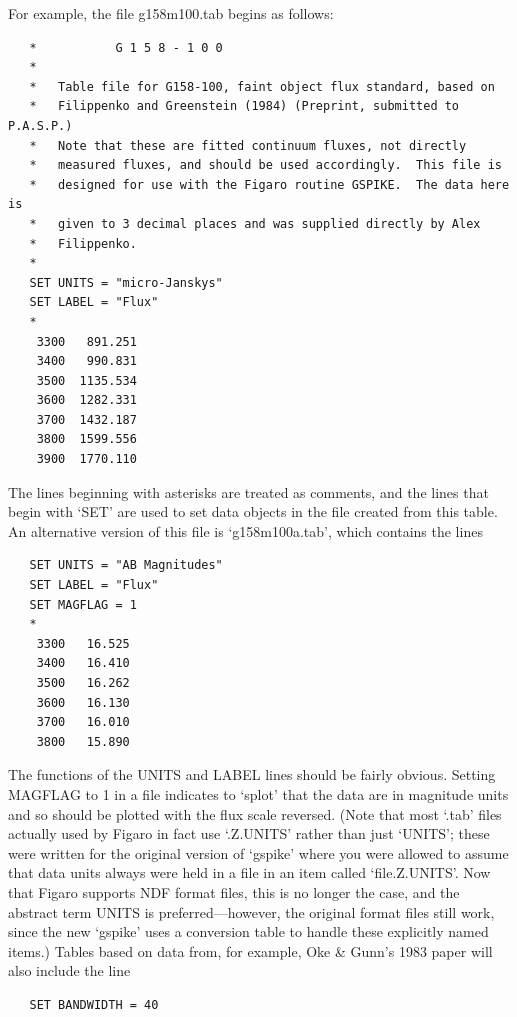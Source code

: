 \documentclass[11pt,twoside]{article}
\newcommand{\latorhtm}[2]{#1}
\newcommand{\latorhtm}[2]{#2}
\begin{document}
   For example, the file g158m100.tab begins as follows:

\begin{verbatim}
   *           G 1 5 8 - 1 0 0
   *
   *   Table file for G158-100, faint object flux standard, based on
   *   Filippenko and Greenstein (1984) (Preprint, submitted to P.A.S.P.)
   *   Note that these are fitted continuum fluxes, not directly
   *   measured fluxes, and should be used accordingly.  This file is
   *   designed for use with the Figaro routine GSPIKE.  The data here is
   *   given to 3 decimal places and was supplied directly by Alex
   *   Filippenko.
   *
   SET UNITS = "micro-Janskys"
   SET LABEL = "Flux"
   *
    3300   891.251
    3400   990.831
    3500  1135.534
    3600  1282.331
    3700  1432.187
    3800  1599.556
    3900  1770.110
\end{verbatim}

   The lines beginning with asterisks are treated as comments, and the
   lines that begin with `SET' are used to set data objects in the file
   created from this table.  An alternative version of this file is
   `g158m100a.tab', which contains the lines

\begin{verbatim}
   SET UNITS = "AB Magnitudes"
   SET LABEL = "Flux"
   SET MAGFLAG = 1
   *
    3300   16.525
    3400   16.410
    3500   16.262
    3600   16.130
    3700   16.010
    3800   15.890
\end{verbatim}

   The functions of the UNITS and LABEL lines should be fairly obvious.
   Setting MAGFLAG to 1 in a file indicates to `splot' that the data are
   in magnitude units and so should be plotted with the flux scale
   reversed. (Note that most `.tab' files actually used by Figaro in
   fact use `.Z.UNITS' rather than just `UNITS'; these were written for
   the original version of `gspike' where you were allowed to assume that
   data units always were held in a file in an item called
   `file.Z.UNITS'.  Now that Figaro supports NDF format files, this is
   no longer the case, and the abstract term UNITS is
   preferred\latorhtm{---}{-}however, the original format files still work,
   since the new `gspike'
   uses a conversion table to handle these explicitly named items.)
   Tables based on data from, for example, Oke \& Gunn's 1983 paper
   will also include the line

\begin{verbatim}
   SET BANDWIDTH = 40
\end{verbatim}
\end{document}
